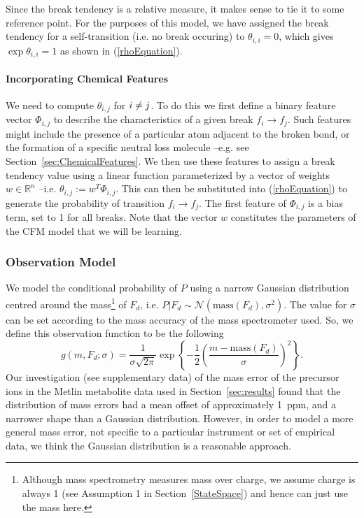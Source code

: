 Since the break tendency is a relative measure, it makes sense to tie it to some reference point. 
For the purposes of this model, we have assigned the break tendency for a self-transition (i.e. no break occuring) to $\theta_{i,i} = 0$, which gives $\exp{\theta_{i,i}}=1$ as shown in (\ref{rhoEquation}). 

\paragraph{Incorporating Chemical Features} 
We need to compute $\theta_{i,j}$ for $i\neq\nobreak j$. 
To do this we first define a binary feature vector $\Phi_{i,j}$ to describe the characteristics of a given break $f_{i}\rightarrow f_{j}$. 
Such features might include the presence of a particular atom adjacent to the broken bond, or the formation of a specific neutral loss molecule --e.g. see Section~\ref{sec:ChemicalFeatures}.
We then use these features to assign a break tendency value using a linear function parameterized by a vector of weights $w \in \mathbb{R}^{n}$ --i.e. $\theta_{i,j} := w^{T}\Phi_{i,j}$. This can then be substituted into (\ref{rhoEquation}) to generate the probability of transition $f_{i} \rightarrow f_{j}$.  The first feature of $\Phi_{i,j}$ is a bias term, set to 1 for all breaks.
Note that the vector $w$ constitutes the parameters of the CFM model that we will be learning.

\subsubsection{Observation Model}
\label{ObservationModel}

\newcommand{\mass}{\text{mass}}

We model the conditional probability of $P$ using a narrow Gaussian distribution centred around the mass\footnote{Although mass spectrometry measures mass over charge, we assume charge is always 1 (see Assumption 1 in Section~\ref{StateSpace}) and hence can just use the mass here.} of $F_{d}$, i.e. $P|F_{d} \sim \mathcal{N}( \mass(F_{d}), \sigma^{2} )$. 
The value for $\sigma$ can be set according to the mass accuracy of the mass spectrometer used. 
So, we define this observation function to be the following
\begin{equation}
\label{obsEquation}
g(m,F_{d};\sigma) = \frac{1}{\sigma\sqrt{2\pi}}\exp \left\{-\frac{1}{2} \left(\frac{m - \mass(F_{d})}{\sigma}\right )^{2} \right\}.
\end{equation}
Our investigation (see supplementary data) of the mass error of the precursor ions in the Metlin metabolite data used in Section~\ref{sec:results} found that the distribution of mass errors 
had a mean offset of approximately 1~ppm, and a narrower shape than a Gaussian distribution.
However, in order to model a more general mass error, not specific to a particular instrument or set of empirical data, we think the Gaussian distribution is a reasonable approach.

